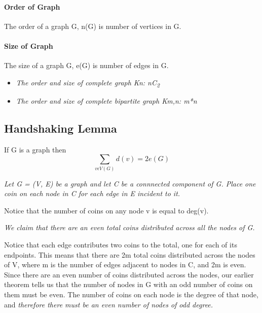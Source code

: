 \paragraph{Order of Graph}The order of a graph G, n(G) is number of vertices in G.

\paragraph{Size of Graph}The size of a graph G, e(G) is number of edges in G.

\begin{itemize}
    \item \textit{The order and size of complete graph Kn: nC\textsubscript{2}}
    \item \textit{The order and size of complete bipartite graph Km,n: m*n}
\end{itemize}


\subsection{Handshaking Lemma} 
If G is a graph then \[ \sum_{v\epsilon V(G)} d(v)=2e(G) \]

\textit{Let G = (V, E) be a graph and let C be a connnected
component of G. Place one coin on each node in C for
each edge in E incident to it. }


Notice that the number of coins on any node v is equal to deg(v).


\textit{We claim that there are an even total coins distributed
across all the nodes of G.}


Notice that each edge contributes two coins to the total, one for each of its
endpoints. This means that there are 2m total coins
distributed across the nodes of V, where m is the number
of edges adjacent to nodes in C, and 2m is even.
Since there are an even number of coins distributed
across the nodes, our earlier theorem tells us that the
number of nodes in G with an odd number of coins on
them must be even. The number of coins on each node is
the degree of that node, and \textit{therefore there must be an
even number of nodes of odd degree.}


